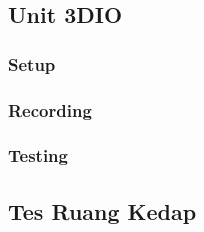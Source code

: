 \documentclass{article}
\begin{document}
	\subsection{Unit 3DIO}

	\subsubsection{Setup}

	\subsubsection{Recording}

	\subsubsection{Testing}

	\subsection{Tes Ruang Kedap}
\end{document}
